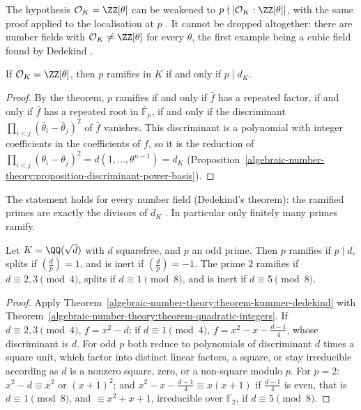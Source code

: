 The hypothesis $\mathcal{O}_K = \ZZ[\theta]$ can be weakened to $p \nmid [\mathcal{O}_K : \ZZ[\theta]]$, with the same proof applied to the localisation at $p$ \cite[Chapter I, Proposition 8.3]{neukirch-ant}.
It cannot be dropped altogether: there are number fields with $\mathcal{O}_K \neq \ZZ[\theta]$ for every $\theta$, the first example being a cubic field found by Dedekind \cite{neukirch-ant}.

\begin{corollary}\label{algebraic-number-theory:corollary-ramification-discriminant}
If $\mathcal{O}_K = \ZZ[\theta]$, then $p$ ramifies in $K$ if and only if $p \mid d_K$.
\end{corollary}

\begin{proof}
By the theorem, $p$ ramifies if and only if $\bar f$ has a repeated factor, if and only if $\bar f$ has a repeated root in $\bar{\mathbb{F}}_p$, if and only if the discriminant
$\prod_{i<j}(\bar\theta_i - \bar\theta_j)^2$ of $\bar f$ vanishes. This discriminant is a polynomial with integer coefficients in the coefficients of $f$, so it is the reduction of
$\prod_{i<j}(\theta_i - \theta_j)^2 = d(1, \dots, \theta^{n-1}) = d_K$ (Proposition~\ref{algebraic-number-theory:proposition-discriminant-power-basis}).
\end{proof}

The statement holds for every number field (Dedekind's theorem): the ramified primes are exactly the divisors of $d_K$ \cite[Chapter III, Corollary 2.12]{neukirch-ant}. In particular only finitely many
primes ramify.

\begin{theorem}\label{algebraic-number-theory:theorem-quadratic-splitting}
Let $K = \QQ(\sqrt d)$ with $d$ squarefree, and $p$ an odd prime. Then $p$ ramifies if $p \mid d$, splits if $(\frac dp) = 1$, and is inert if $(\frac dp) = -1$. The prime $2$ ramifies if
$d \equiv 2, 3 \pmod 4$, splits if $d \equiv 1 \pmod 8$, and is inert if $d \equiv 5 \pmod 8$.
\end{theorem}

\begin{proof}
Apply Theorem~\ref{algebraic-number-theory:theorem-kummer-dedekind} with Theorem~\ref{algebraic-number-theory:theorem-quadratic-integers}. If $d \equiv 2, 3 \pmod 4$, $f = x^2 - d$; if $d \equiv 1 \pmod 4$,
$f = x^2 - x - \frac{d - 1}{4}$, whose discriminant is $d$. For odd $p$ both reduce to polynomials of discriminant $d$ times a square unit, which factor into distinct linear factors, a square, or stay
irreducible according as $d$ is a nonzero square, zero, or a non-square modulo $p$. For $p = 2$: $x^2 - d \equiv x^2$ or $(x + 1)^2$; and $x^2 - x - \frac{d - 1}{4} \equiv x(x + 1)$ if $\frac{d - 1}{4}$ is even,
that is $d \equiv 1 \pmod 8$, and $\equiv x^2 + x + 1$, irreducible over $\mathbb{F}_2$, if $d \equiv 5 \pmod 8$.
\end{proof}

